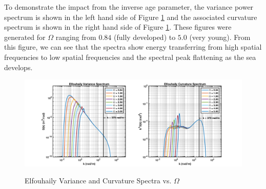 To demonstrate the impact from the inverse age parameter, the variance power spectrum is shown in the left hand side of Figure \ref{os_fig:3a} and the associated curvature spectrum is shown in the right hand side of Figure \ref{os_fig:3a}. These figures were generated for $\Omega$ ranging from $0.84$ (fully developed) to $5.0$ (very young). From this figure, we can see that the spectra show energy transferring from high spatial frequencies to low spatial frequencies and the spectral peak flattening as the sea develops.
\begin{figure}[H]
  \begin{center}
\includegraphics[width=6in]{../media/Ocean_Surface/elf_variance_curvature_spectrum_age.png}
  \end{center}
  \renewcommand{\baselinestretch}{1} \small\normalsize
  \begin{quote}
    \caption[Elfouhaily Variance and Curvature Spectra vs. $\Omega$]{Elfouhaily Variance and Curvature Spectra vs. $\Omega$ \label{os_fig:3a}}
  \end{quote}
\end{figure}
\renewcommand{\baselinestretch}{2} \small\normalsize

